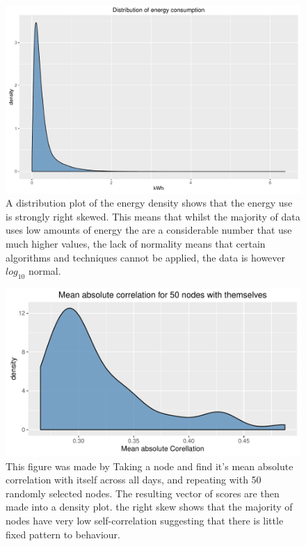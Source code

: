 \begin{figure}
    \centering
    \includegraphics[width = \textwidth]{Figures/Results/energydensity}
    \caption[Energy density distribution]{ A distribution plot of the energy density shows that the energy use is strongly right skewed. This means that whilst the majority of data uses low amounts of energy the are a considerable number that use much higher values, the lack of normality means that certain algorithms and techniques cannot be applied, the data is however $log_10$ normal.}
    \label{fig:energydensity}
\end{figure}

\begin{figure}
    \centering
    \includegraphics[width = \textwidth]{Figures/Results/MeanAbsCorr}
    \caption[Node mean absolute correlation]{This figure was made by Taking a node and find it's mean absolute correlation with itself across all days, and repeating with 50 randomly selected nodes. The resulting vector of scores are then made into a density plot. the right skew shows that the majority of nodes have very low self-correlation suggesting that there is little fixed pattern to behaviour.}
    \label{fig:MeanAbsCorr}
\end{figure}

